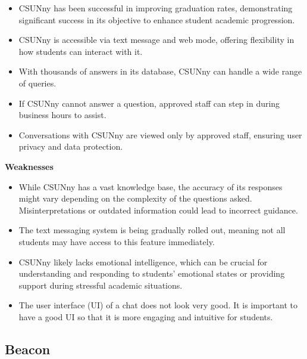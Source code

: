 \documentclass{l4proj}
\begin{document}
\begin{itemize}
    \item CSUNny has been successful in improving graduation rates, demonstrating significant success in its objective to enhance student academic progression.
    
    \item CSUNny is accessible via text message and web mode, offering flexibility in how students can interact with it.

    \item With thousands of answers in its database, CSUNny can handle a wide range of queries.

    \item If CSUNny cannot answer a question, approved staff can step in during business hours to assist.

    \item Conversations with CSUNny are viewed only by approved staff, ensuring user privacy and data protection.
    
\end{itemize}

\textbf{Weaknesses}

\begin{itemize}

    \item While CSUNny has a vast knowledge base, the accuracy of its responses might vary depending on the complexity of the questions asked. Misinterpretations or outdated information could lead to incorrect guidance.

    \item The text messaging system is being gradually rolled out, meaning not all students may have access to this feature immediately.

    \item CSUNny likely lacks emotional intelligence, which can be crucial for understanding and responding to students' emotional states or providing support during stressful academic situations.

    \item The user interface (UI) of a chat does not look very good. It is important to have a good UI so that it is more engaging and intuitive for students. 

\end{itemize}

\subsection{Beacon}
\end{document}
